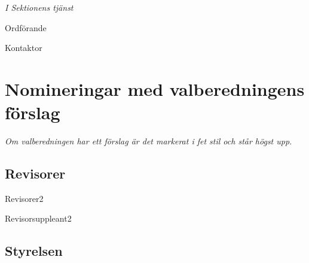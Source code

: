 \documentclass[10pt]{article}
\def\ordf{Fredrik Peterson}
\def\sekr{Erik Månsson}
\begin{document}
\begin{signatures}{2}
    \emph{I Sektionens tjänst}
    \signature{\ordf}{Ordförande}
    \signature{\sekr}{Kontaktor}
\end{signatures}

\section{Nomineringar med valberedningens förslag}
\emph{Om valberedningen har ett förslag är det markerat i fet stil och står högst upp.}

\subsection{Revisorer}

\begin{vallista}
    \begin{post}{Revisorer}{2}
    \end{post}
    \begin{post}{Revisorsuppleant}{2}
        \vakant
        \vakant
    \end{post}
\end{vallista}

\subsection{Styrelsen}
\end{document}
